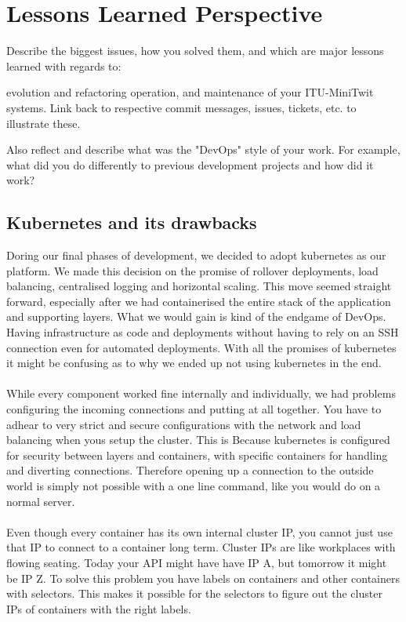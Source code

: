 \documentclass[12pt]{article}
\begin{document}
\section{Lessons Learned Perspective}
Describe the biggest issues, how you solved them, and which are major lessons learned with regards to:

evolution and refactoring
operation, and
maintenance
of your ITU-MiniTwit systems. Link back to respective commit messages, issues, tickets, etc. to illustrate these.

Also reflect and describe what was the "DevOps" style of your work. For example, what did you do differently to previous development projects and how did it work?

\subsection{Kubernetes and its drawbacks}
Doring our final phases of development, we decided to adopt kubernetes as our platform. We made this decision on the promise of rollover deployments, load balancing, centralised logging and horizontal scaling. This move seemed straight forward, especially after we had containerised the entire stack of the application and supporting layers. What we would gain is kind of the endgame of DevOps. Having infrastructure as code and deployments without having to rely on an SSH connection even for automated deployments. With all the promises of kubernetes it might be confusing as to why we ended up not using kubernetes in the end.
\\\\
While every component worked fine internally and individually, we had problems configuring the incoming connections and putting at all together. You have to adhear to very strict and secure configurations with the network and load balancing when yous setup the cluster. This is Because kubernetes is configured for security between layers and containers, with specific containers for handling and diverting connections. Therefore opening up a connection to the outside world is simply not possible with a one line command, like you would do on a normal server.
\\\\
Even though every container has its own internal cluster IP, you cannot just use that IP to connect to a container long term. Cluster IPs are like workplaces with flowing seating. Today your API might have have IP A, but tomorrow it might be IP Z. To solve this problem you have labels on containers and other containers with selectors. This makes it possible for the selectors to figure out the cluster IPs of containers with the right labels. 
\end{document}
